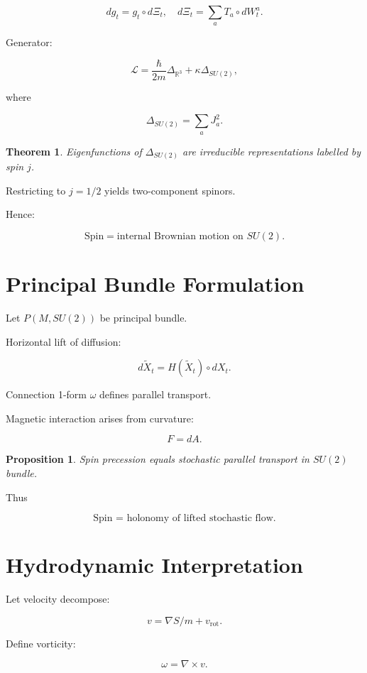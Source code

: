 \documentclass[12pt]{article}
\newtheorem{theorem}{Theorem}
\newtheorem{proposition}{Proposition}
\begin{document}
\[
dg_t = g_t \circ d\Xi_t,
\quad
d\Xi_t = \sum_a T_a \circ dW_t^a.
\]

Generator:

\[
\mathcal{L}
=
\frac{\hbar}{2m}\Delta_{\mathbb{R}^3}
+
\kappa \Delta_{SU(2)},
\]

where

\[
\Delta_{SU(2)} = \sum_a J_a^2.
\]

\begin{theorem}
Eigenfunctions of $\Delta_{SU(2)}$ are irreducible
representations labelled by spin $j$.
\end{theorem}

Restricting to $j=1/2$ yields two-component spinors.

Hence:

\[
\text{Spin} = \text{internal Brownian motion on } SU(2).
\]

\section{Principal Bundle Formulation}

Let $P(M,SU(2))$ be principal bundle.

Horizontal lift of diffusion:

\[
d\tilde{X}_t = H(\tilde{X}_t)\circ dX_t.
\]

Connection 1-form $\omega$ defines parallel transport.

Magnetic interaction arises from curvature:

\[
F=dA.
\]

\begin{proposition}
Spin precession equals stochastic parallel transport
in $SU(2)$ bundle.
\end{proposition}

Thus

\[
\boxed{
\text{Spin = holonomy of lifted stochastic flow.}
}
\]

\section{Hydrodynamic Interpretation}

Let velocity decompose:

\[
v = \nabla S/m + v_{\text{rot}}.
\]

Define vorticity:

\[
\omega = \nabla\times v.
\]
\end{document}

